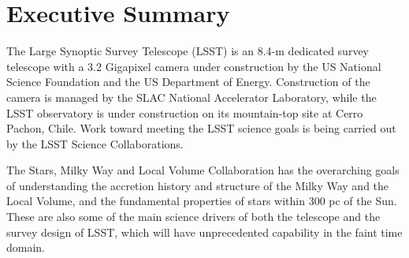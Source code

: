 \section{Executive Summary}

The Large Synoptic Survey Telescope (LSST) is an 8.4-m dedicated survey telescope with a 3.2 Gigapixel camera under construction by the US National Science Foundation and the US Department of Energy. Construction of the camera is managed by the SLAC National Accelerator Laboratory, while the LSST observatory is under construction on its mountain-top site at Cerro Pachon, Chile. Work toward meeting the LSST science goals is being carried out by the LSST Science Collaborations.

The Stars, Milky Way and Local Volume Collaboration has the overarching goals of understanding the accretion history and structure of the Milky Way and the Local Volume, and the fundamental properties of stars within 300 pc of the Sun. These are also some of the main science drivers of both the telescope and the survey design of LSST, which will have unprecedented capability in the faint time domain.

